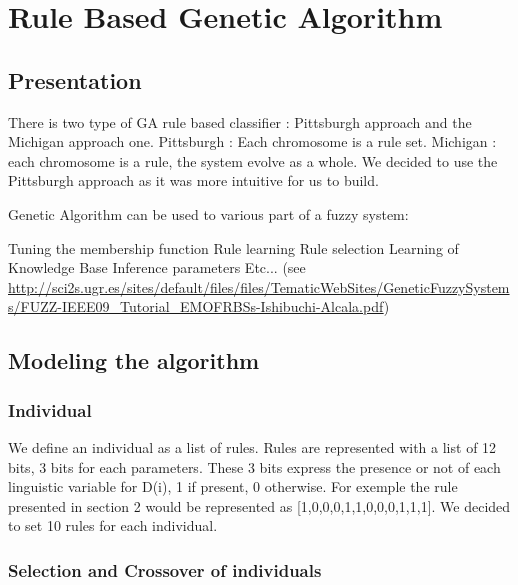 \documentclass[a4paper,12pt]{article}
\begin{document}
\section{Rule Based Genetic Algorithm}

\subsection{Presentation}

There is two type of GA rule based classifier : Pittsburgh approach and the Michigan approach one. Pittsburgh : Each chromosome is a rule set. Michigan : each chromosome is a rule, the system evolve as a whole. We decided to use the Pittsburgh approach as it was more intuitive for us to build.


Genetic Algorithm can be used to various part of a fuzzy system:

Tuning the membership function
Rule learning
Rule selection
Learning of Knowledge Base
Inference parameters
Etc... (see \url{http://sci2s.ugr.es/sites/default/files/files/TematicWebSites/GeneticFuzzySystems/FUZZ-IEEE09_Tutorial_EMOFRBSs-Ishibuchi-Alcala.pdf})

\subsection{Modeling the algorithm}

\subsubsection{Individual}

We define an individual as a list of rules. Rules are represented with a list of 12 bits, 3 bits for each parameters.
These 3 bits express the presence or not of each linguistic variable for D(i), 1 if present, 0 otherwise.
For exemple the rule presented in section 2 would be represented as [1,0,0,0,1,1,0,0,0,1,1,1].
We decided to set 10 rules for each individual.

\subsubsection{Selection and Crossover of individuals}
\end{document}
